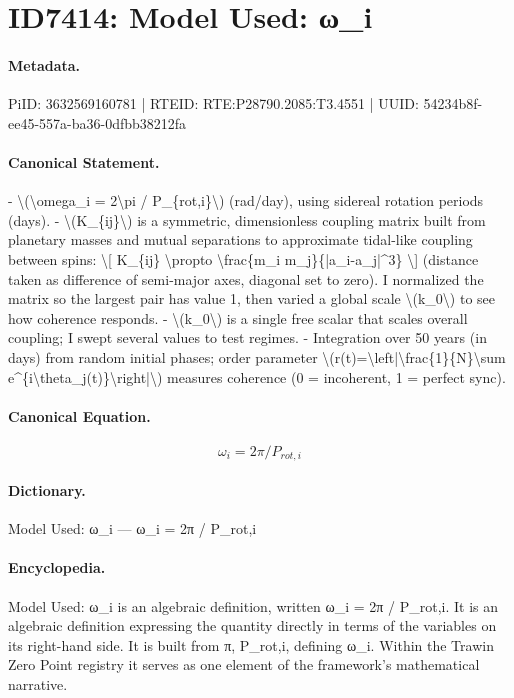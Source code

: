 \section*{ID7414: Model Used: ω\_i}
\paragraph{Metadata.}
PiID: 3632569160781 | RTEID: RTE:P28790.2085:T3.4551 | UUID: 54234b8f-ee45-557a-ba36-0dfbb38212fa

\paragraph{Canonical Statement.}
- \textbackslash{}(\textbackslash{}omega\_i = 2\textbackslash{}pi / P\_\{rot,i\}\textbackslash{}) (rad/day), using sidereal rotation periods (days). - \textbackslash{}(K\_\{ij\}\textbackslash{}) is a symmetric, dimensionless coupling matrix built from planetary masses and mutual separations to approximate tidal-like coupling between spins: \textbackslash{}[ K\_\{ij\} \textbackslash{}propto \textbackslash{}frac\{m\_i m\_j\}\{|a\_i-a\_j|\textasciicircum{}3\} \textbackslash{}] (distance taken as difference of semi-major axes, diagonal set to zero). I normalized the matrix so the largest pair has value 1, then varied a global scale \textbackslash{}(k\_0\textbackslash{}) to see how coherence responds. - \textbackslash{}(k\_0\textbackslash{}) is a single free scalar that scales overall coupling; I swept several values to test regimes. - Integration over 50 years (in days) from random initial phases; order parameter \textbackslash{}(r(t)=\textbackslash{}left|\textbackslash{}frac\{1\}\{N\}\textbackslash{}sum e\textasciicircum{}\{i\textbackslash{}theta\_j(t)\}\textbackslash{}right|\textbackslash{}) measures coherence (0 = incoherent, 1 = perfect sync).

\paragraph{Canonical Equation.}
\[
\omega_i = 2\pi / P_{rot,i}
\]

\paragraph{Dictionary.}
Model Used: ω\_i — ω\_i = 2π / P\_rot,i

\paragraph{Encyclopedia.}
Model Used: ω\_i is an algebraic definition, written ω\_i = 2π / P\_rot,i. It is an algebraic definition expressing the quantity directly in terms of the variables on its right-hand side. It is built from π, P\_rot,i, defining ω\_i. Within the Trawin Zero Point registry it serves as one element of the framework's mathematical narrative.
